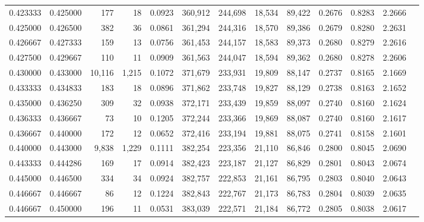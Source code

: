 \begin{tabular}{rrrrrrrrrrrrr}
0.423333 & 0.425000 &    177 &    18 &                                     0.0923 & 360,912 & 244,698 &  18,534 &  89,422 & 0.2676 & 0.8283 & 2.2666 \\
0.425000 & 0.426500 &    382 &    36 &                                     0.0861 & 361,294 & 244,316 &  18,570 &  89,386 & 0.2679 & 0.8280 & 2.2631 \\
0.426667 & 0.427333 &    159 &    13 &                                     0.0756 & 361,453 & 244,157 &  18,583 &  89,373 & 0.2680 & 0.8279 & 2.2616 \\
0.427500 & 0.429667 &    110 &    11 &                                     0.0909 & 361,563 & 244,047 &  18,594 &  89,362 & 0.2680 & 0.8278 & 2.2606 \\
0.430000 & 0.433000 & 10,116 & 1,215 &                                     0.1072 & 371,679 & 233,931 &  19,809 &  88,147 & 0.2737 & 0.8165 & 2.1669 \\
0.433333 & 0.434833 &    183 &    18 &                                     0.0896 & 371,862 & 233,748 &  19,827 &  88,129 & 0.2738 & 0.8163 & 2.1652 \\
0.435000 & 0.436250 &    309 &    32 &                                     0.0938 & 372,171 & 233,439 &  19,859 &  88,097 & 0.2740 & 0.8160 & 2.1624 \\
0.436333 & 0.436667 &     73 &    10 &                                     0.1205 & 372,244 & 233,366 &  19,869 &  88,087 & 0.2740 & 0.8160 & 2.1617 \\
0.436667 & 0.440000 &    172 &    12 &                                     0.0652 & 372,416 & 233,194 &  19,881 &  88,075 & 0.2741 & 0.8158 & 2.1601 \\
0.440000 & 0.443000 &  9,838 & 1,229 &                                     0.1111 & 382,254 & 223,356 &  21,110 &  86,846 & 0.2800 & 0.8045 & 2.0690 \\
0.443333 & 0.444286 &    169 &    17 &                                     0.0914 & 382,423 & 223,187 &  21,127 &  86,829 & 0.2801 & 0.8043 & 2.0674 \\
0.445000 & 0.446500 &    334 &    34 &                                     0.0924 & 382,757 & 222,853 &  21,161 &  86,795 & 0.2803 & 0.8040 & 2.0643 \\
0.446667 & 0.446667 &     86 &    12 &                                     0.1224 & 382,843 & 222,767 &  21,173 &  86,783 & 0.2804 & 0.8039 & 2.0635 \\
0.446667 & 0.450000 &    196 &    11 &                                     0.0531 & 383,039 & 222,571 &  21,184 &  86,772 & 0.2805 & 0.8038 & 2.0617 \\

\end{tabular}
